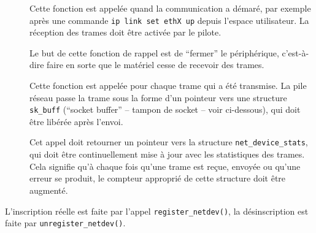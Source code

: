 \documentclass[a4paper,12pt,BCOR=6mm,bibtotoc,idxtotoc]{scrbook}
\begin{document}
\newsavebox\boxopen
\sbox{}
\newsavebox\boxstop
\sbox{}
\newsavebox\boxxmit
\sbox{}
\newsavebox\boxstats
\sbox{}

\begin{description}

\item[\usebox\boxopen] Cette fonction est appel\'ee quand la
  communication a d\'emar\'e, par exemple apr\`es une commande
  \lstinline+ip link set ethX up+ depuis l'espace utilisateur. La
  r\'eception des trames doit \^etre activ\'ee par le pilote.

\item[\usebox\boxstop] Le but de cette fonction de rappel est de
  ``fermer'' le p\'eriph\'erique, c'est-\`a-dire faire en sorte que le
  mat\'eriel cesse de recevoir des trames.

\item[\usebox\boxxmit] Cette fonction est appel\'ee pour chaque trame
  qui a \'et\'e transmise.  La pile r\'eseau passe la trame sous la
  forme d'un pointeur vers une structure \lstinline+sk_buff+ (``socket
  buffer'' -- tampon de socket -- voir ci-dessous),
  qui doit \^etre lib\'er\'ee apr\`es l'envoi.

\item[\usebox\boxstats] Cet appel doit retourner un pointeur vers la
  structure \lstinline+net_device_stats+, qui doit \^etre
  continuellement mise \`a jour avec les statistiques des trames. Cela
  signifie qu'\`a chaque fois qu'une trame est re\c{c}ue, envoy\'ee ou
  qu'une erreur se produit, le compteur appropri\'e de cette structure
  doit \^etre augment\'e.

\end{description}

L'inscription r\'eelle est faite par l'appel \lstinline+register_netdev()+,
la d\'esinscription est faite par \lstinline+unregister_netdev()+.
\end{document}
